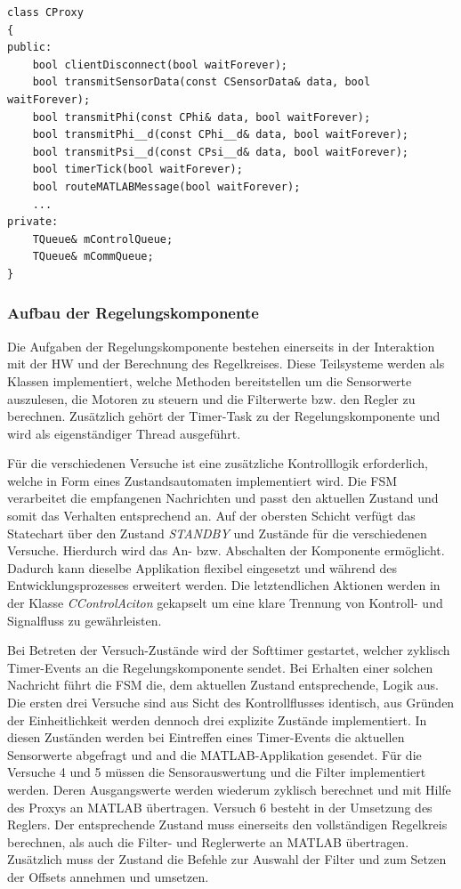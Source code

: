 \documentclass{article}
\begin{document}
\newpage
\begin{lstlisting}
class CProxy
{
public:
	bool clientDisconnect(bool waitForever);
	bool transmitSensorData(const CSensorData& data, bool waitForever);
	bool transmitPhi(const CPhi& data, bool waitForever);
	bool transmitPhi__d(const CPhi__d& data, bool waitForever);
	bool transmitPsi__d(const CPsi__d& data, bool waitForever);
	bool timerTick(bool waitForever);
	bool routeMATLABMessage(bool waitForever);
	...
private:
	TQueue& mControlQueue;
	TQueue& mCommQueue;
}
\end{lstlisting}

\subsubsection{Aufbau der Regelungskomponente}
Die Aufgaben der Regelungskomponente bestehen einerseits in der Interaktion mit der HW und der Berechnung des Regelkreises. Diese Teilsysteme werden als Klassen implementiert, welche Methoden bereitstellen um die Sensorwerte auszulesen, die Motoren zu steuern und die Filterwerte bzw. den Regler zu berechnen. Zusätzlich gehört der Timer-Task zu der Regelungskomponente und wird als eigenständiger Thread ausgeführt. 


Für die verschiedenen Versuche ist eine zusätzliche Kontrolllogik erforderlich, welche in Form eines Zustandsautomaten implementiert wird. Die FSM verarbeitet die empfangenen Nachrichten und passt den aktuellen Zustand und somit das Verhalten entsprechend an. Auf der obersten Schicht verfügt das Statechart über den Zustand \textit{STANDBY} und Zustände für die verschiedenen Versuche. Hierdurch wird das An- bzw. Abschalten der Komponente ermöglicht. Dadurch kann dieselbe Applikation flexibel eingesetzt und während des Entwicklungsprozesses erweitert werden. Die letztendlichen Aktionen werden in der Klasse \textit{CControlAciton} gekapselt um eine klare Trennung von Kontroll- und Signalfluss zu gewährleisten.


Bei Betreten der Versuch-Zustände wird der Softtimer gestartet, welcher zyklisch Timer-Events an die Regelungskomponente sendet. Bei Erhalten einer solchen Nachricht führt die FSM die, dem aktuellen Zustand entsprechende, Logik aus. 
Die ersten drei Versuche sind aus Sicht des Kontrollflusses identisch, aus Gründen der Einheitlichkeit werden dennoch drei explizite Zustände implementiert. In diesen Zuständen werden bei Eintreffen eines Timer-Events die aktuellen Sensorwerte abgefragt und and die MATLAB-Applikation gesendet. Für die Versuche 4 und 5 müssen die Sensorauswertung und die Filter implementiert werden. Deren Ausgangswerte werden wiederum zyklisch berechnet und mit Hilfe des Proxys an MATLAB übertragen. Versuch 6 besteht in der Umsetzung des Reglers. Der entsprechende Zustand muss einerseits den vollständigen Regelkreis berechnen, als auch die Filter- und Reglerwerte an MATLAB übertragen. Zusätzlich muss der Zustand die Befehle zur Auswahl der Filter und zum Setzen der Offsets annehmen und umsetzen.
\end{document}
